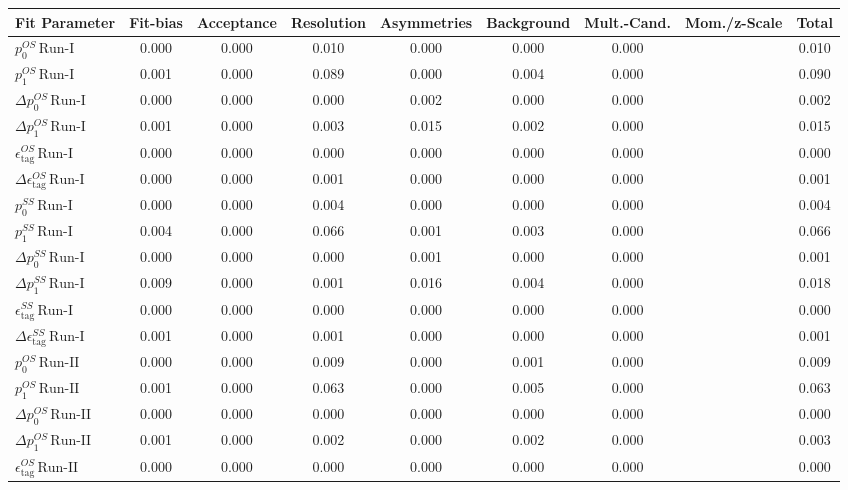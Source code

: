 \begin{tabular}{l  c  c  c  c  c  c  c  | c }
\hline
\hline
Fit Parameter & Fit-bias & Acceptance & Resolution & Asymmetries & Background & Mult.-Cand. & Mom./z-Scale &  Total  \\ 
\hline
$p_{0}^{OS} \, \text{Run-I}$ & 0.000 & 0.000 & 0.010 & 0.000 & 0.000 & 0.000 &  & 0.010 \\ 
$p_{1}^{OS} \, \text{Run-I}$ & 0.001 & 0.000 & 0.089 & 0.000 & 0.004 & 0.000 &  & 0.090 \\ 
$\Delta p_{0}^{OS} \, \text{Run-I}$ & 0.000 & 0.000 & 0.000 & 0.002 & 0.000 & 0.000 &  & 0.002 \\ 
$\Delta p_{1}^{OS} \, \text{Run-I}$ & 0.001 & 0.000 & 0.003 & 0.015 & 0.002 & 0.000 &  & 0.015 \\ 
$\epsilon_{\text{tag}}^{OS} \, \text{Run-I}$ & 0.000 & 0.000 & 0.000 & 0.000 & 0.000 & 0.000 &  & 0.000 \\ 
$\Delta \epsilon_{\text{tag}}^{OS} \, \text{Run-I}$ & 0.000 & 0.000 & 0.001 & 0.000 & 0.000 & 0.000 &  & 0.001 \\ 
$p_{0}^{SS} \, \text{Run-I}$ & 0.000 & 0.000 & 0.004 & 0.000 & 0.000 & 0.000 &  & 0.004 \\ 
$p_{1}^{SS} \, \text{Run-I}$ & 0.004 & 0.000 & 0.066 & 0.001 & 0.003 & 0.000 &  & 0.066 \\ 
$\Delta p_{0}^{SS} \, \text{Run-I}$ & 0.000 & 0.000 & 0.000 & 0.001 & 0.000 & 0.000 &  & 0.001 \\ 
$\Delta p_{1}^{SS} \, \text{Run-I}$ & 0.009 & 0.000 & 0.001 & 0.016 & 0.004 & 0.000 &  & 0.018 \\ 
$\epsilon_{\text{tag}}^{SS} \, \text{Run-I}$ & 0.000 & 0.000 & 0.000 & 0.000 & 0.000 & 0.000 &  & 0.000 \\ 
$\Delta \epsilon_{\text{tag}}^{SS} \, \text{Run-I}$ & 0.001 & 0.000 & 0.001 & 0.000 & 0.000 & 0.000 &  & 0.001 \\ 
$p_{0}^{OS} \, \text{Run-II}$ & 0.000 & 0.000 & 0.009 & 0.000 & 0.001 & 0.000 &  & 0.009 \\ 
$p_{1}^{OS} \, \text{Run-II}$ & 0.001 & 0.000 & 0.063 & 0.000 & 0.005 & 0.000 &  & 0.063 \\ 
$\Delta p_{0}^{OS} \, \text{Run-II}$ & 0.000 & 0.000 & 0.000 & 0.000 & 0.000 & 0.000 &  & 0.000 \\ 
$\Delta p_{1}^{OS} \, \text{Run-II}$ & 0.001 & 0.000 & 0.002 & 0.000 & 0.002 & 0.000 &  & 0.003 \\ 
$\epsilon_{\text{tag}}^{OS} \, \text{Run-II}$ & 0.000 & 0.000 & 0.000 & 0.000 & 0.000 & 0.000 &  & 0.000 \\ 

\end{tabular}
